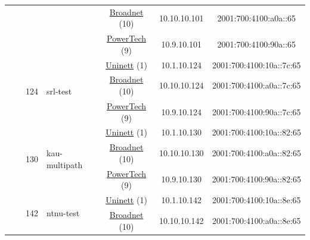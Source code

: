 \begin{small}
\begin{center}
\begin{longtable}{|c|c|c|c|c|c|c|c|}
  &  & \multicolumn{2}{|c|}{} & \multicolumn{2}{|c|}{\tiny{\href{https://www.broadnet.no}{Broadnet} (10)}} & \tiny{10.10.10.101} & \tiny{2001:700:4100:a0a::65} \\* \cline{5-5}\cline{6-6}\cline{7-7}\cline{8-8}
  &  & \multicolumn{2}{|c|}{} & \multicolumn{2}{|c|}{\tiny{\href{http://www.powertech.no}{PowerTech} (9)}} & \tiny{10.9.10.101} & \tiny{2001:700:4100:90a::65} \\* \cline{3-3}\cline{4-4}\cline{5-5}\cline{6-6}\cline{7-7}\cline{8-8}
  &  & \multirow{3}{*}{\tiny{124}} & \multicolumn{1}{|l|}{\multirow{3}{*}{\tiny{srl-test}}} & \multicolumn{2}{|c|}{\tiny{\href{https://www.uninett.no}{Uninett} (1)}} & \tiny{10.1.10.124} & \tiny{2001:700:4100:10a::7c:65} \\* \cline{5-5}\cline{6-6}\cline{7-7}\cline{8-8}
  &  &  &  & \multicolumn{2}{|c|}{\tiny{\href{https://www.broadnet.no}{Broadnet} (10)}} & \tiny{10.10.10.124} & \tiny{2001:700:4100:a0a::7c:65} \\* \cline{5-5}\cline{6-6}\cline{7-7}\cline{8-8}
  &  &  &  & \multicolumn{2}{|c|}{\tiny{\href{http://www.powertech.no}{PowerTech} (9)}} & \tiny{10.9.10.124} & \tiny{2001:700:4100:90a::7c:65} \\* \cline{3-3}\cline{4-4}\cline{5-5}\cline{6-6}\cline{7-7}\cline{8-8}
  &  & \multirow{3}{*}{\tiny{130}} & \multicolumn{1}{|l|}{\multirow{3}{*}{\tiny{kau-multipath}}} & \multicolumn{2}{|c|}{\tiny{\href{https://www.uninett.no}{Uninett} (1)}} & \tiny{10.1.10.130} & \tiny{2001:700:4100:10a::82:65} \\* \cline{5-5}\cline{6-6}\cline{7-7}\cline{8-8}
  &  &  &  & \multicolumn{2}{|c|}{\tiny{\href{https://www.broadnet.no}{Broadnet} (10)}} & \tiny{10.10.10.130} & \tiny{2001:700:4100:a0a::82:65} \\* \cline{5-5}\cline{6-6}\cline{7-7}\cline{8-8}
  &  &  &  & \multicolumn{2}{|c|}{\tiny{\href{http://www.powertech.no}{PowerTech} (9)}} & \tiny{10.9.10.130} & \tiny{2001:700:4100:90a::82:65} \\* \cline{3-3}\cline{4-4}\cline{5-5}\cline{6-6}\cline{7-7}\cline{8-8}
  &  & \multirow{3}{*}{\tiny{142}} & \multicolumn{1}{|l|}{\multirow{3}{*}{\tiny{ntnu-test}}} & \multicolumn{2}{|c|}{\tiny{\href{https://www.uninett.no}{Uninett} (1)}} & \tiny{10.1.10.142} & \tiny{2001:700:4100:10a::8e:65} \\* \cline{5-5}\cline{6-6}\cline{7-7}\cline{8-8}
  &  &  &  & \multicolumn{2}{|c|}{\tiny{\href{https://www.broadnet.no}{Broadnet} (10)}} & \tiny{10.10.10.142} & \tiny{2001:700:4100:a0a::8e:65} \\* \cline{5-5}\cline{6-6}\cline{7-7}\cline{8-8}

\end{longtable}
\end{center}
\end{small}
